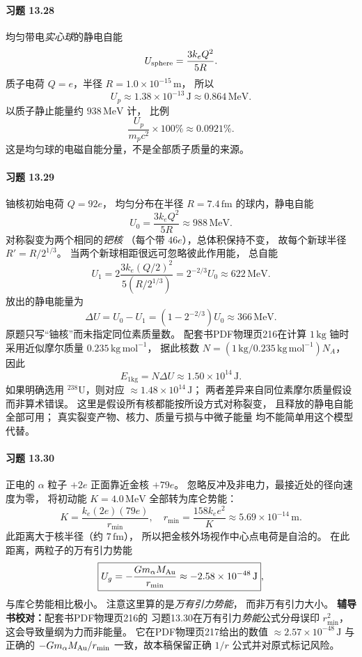 \paragraph{习题 13.28}
均匀带电\emph{实心球}的静电自能
\[
 U_{\rm sphere}=\frac{3k_eQ^2}{5R}.
\]
质子电荷 \(Q=e\)，半径
\(R=1.0\times10^{-15}\,\mathrm m\)，
所以
\[
 \boxed{U_p\approx1.38\times10^{-13}\,\mathrm J
 \approx0.864\,\mathrm{MeV}}.
\]
以质子静止能量约 \(938\,\mathrm{MeV}\) 计，
比例
\[
 \boxed{\frac{U_p}{m_pc^2}\times100\%
 \approx0.0921\%}.
\]
这是均匀球的电磁自能分量，不是全部质子质量的来源。

\paragraph{习题 13.29}
铀核初始电荷 \(Q=92e\)，
均匀分布在半径 \(R=7.4\,\mathrm{fm}\)
的球内，静电自能
\[
 U_0=\frac{3k_eQ^2}{5R}
 \approx\boxed{988\,\mathrm{MeV}}.
\]
对称裂变为两个相同的\emph{钯核}
（每个带 \(46e\)），总体积保持不变，
故每个新球半径 \(R'=R/2^{1/3}\)。
当两个新球相距很远可忽略彼此作用能，
总自能
\[
 U_1=2\frac{3k_e(Q/2)^2}{5(R/2^{1/3})}
 =2^{-2/3}U_0
 \approx\boxed{622\,\mathrm{MeV}}.
\]
放出的静电能量为
\[
 \boxed{\Delta U=U_0-U_1
 =(1-2^{-2/3})U_0\approx366\,\mathrm{MeV}}.
\]
原题只写“铀核”而未指定同位素质量数。
配套书PDF物理页216在计算 \(1\,\mathrm{kg}\) 铀时
采用近似摩尔质量 \(0.235\,\mathrm{kg\,mol^{-1}}\)，
据此核数
\(N=(1\,\mathrm{kg}/0.235\,\mathrm{kg\,mol^{-1}})N_A\)，
因此
\[
 \boxed{E_{1\mathrm{kg}}=N\Delta U
 \approx1.50\times10^{14}\,\mathrm J}.
\]
如果明确选用 \({}^{238}\mathrm U\)，则对应
\(\approx1.48\times10^{14}\,\mathrm J\)；
两者差异来自同位素摩尔质量假设而非算术错误。
这里是假设所有核都能按所设方式对称裂变，
且释放的静电自能全部可用；
真实裂变产物、核力、质量亏损与中微子能量
均不能简单用这个模型代替。

\paragraph{习题 13.30}
正电的 \(\alpha\) 粒子 \(+2e\)
正面靠近金核 \(+79e\)。
忽略反冲及非电力，最接近处的径向速度为零，
将初动能 \(K=4.0\,\mathrm{MeV}\)
全部转为库仑势能：
\[
 K=\frac{k_e(2e)(79e)}{r_{\min}},
 \quad
 \boxed{r_{\min}=\frac{158k_ee^2}{K}
 \approx5.69\times10^{-14}\,\mathrm m}.
\]
此距离大于核半径（约 \(7\,\mathrm{fm}\)），
所以把金核外场视作中心点电荷是自洽的。
在此距离，两粒子的万有引力势能
\[
 \boxed{U_g=-\frac{Gm_\alpha M_{\rm Au}}{r_{\min}}
 \approx-2.58\times10^{-48}\,\mathrm J},
\]
与库仑势能相比极小。
注意这里算的是\emph{万有引力势能}，
而非万有引力大小。
\textbf{辅导书校对：}配套书PDF物理页216的
习题13.30在万有引力\emph{势能}公式分母误印
\(r_{\min}^2\)，这会导致量纲为力而非能量。
它在PDF物理页217给出的数值
\(\approx2.57\times10^{-48}\,\mathrm J\)
与正确的 \(-Gm_\alpha M_{\rm Au}/r_{\min}\)
一致，故本稿保留正确 \(1/r\) 公式并对原式标记风险。

